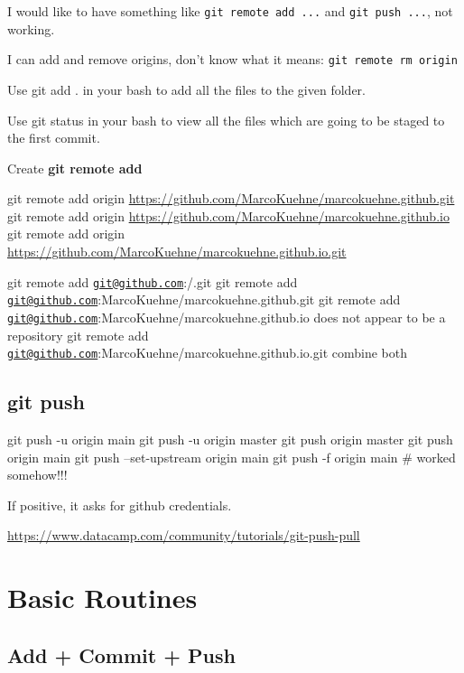 \documentclass[
]{book}
\begin{document}
I would like to have something like \texttt{git\ remote\ add\ ...} and \texttt{git\ push\ ...}, not working.

I can add and remove origins, don't know what it means: \texttt{git\ remote\ rm\ origin}

Use git add . in your bash to add all the files to the given folder.

Use git status in your bash to view all the files which are going to be staged to the first commit.

Create \textbf{git remote add}

git remote add origin \url{https://github.com/MarcoKuehne/marcokuehne.github.git}
git remote add origin \url{https://github.com/MarcoKuehne/marcokuehne.github.io}
git remote add origin \url{https://github.com/MarcoKuehne/marcokuehne.github.io.git}

git remote add \href{mailto:git@github.com}{\nolinkurl{git@github.com}}:/.git
git remote add \href{mailto:git@github.com}{\nolinkurl{git@github.com}}:MarcoKuehne/marcokuehne.github.git
git remote add \href{mailto:git@github.com}{\nolinkurl{git@github.com}}:MarcoKuehne/marcokuehne.github.io does not appear to be a repository
git remote add \href{mailto:git@github.com}{\nolinkurl{git@github.com}}:MarcoKuehne/marcokuehne.github.io.git combine both

\hypertarget{git-push}{%
\subsection{git push}\label{git-push}}

git push -u origin main
git push -u origin master
git push origin master
git push origin main
git push --set-upstream origin main
git push -f origin main \# worked somehow!!!

If positive, it asks for github credentials.

\url{https://www.datacamp.com/community/tutorials/git-push-pull}

\hypertarget{basic-routines}{%
\section{Basic Routines}\label{basic-routines}}

\hypertarget{add-commit-push}{%
\subsection{Add + Commit + Push}\label{add-commit-push}}
\end{document}

